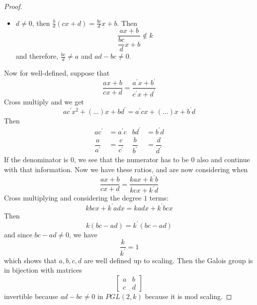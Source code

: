 \documentclass{article}
\begin{document}
\begin{proof}
\begin{itemize}
                \item $d \neq 0$, then $\frac{b}{d}(cx + d) = \frac{bc}{d}x + b$. Then
                    \begin{equation*}
                        \dfrac{ax + b}{\dfrac{bc}{d}x + b} \notin k
                    \end{equation*}
                and therefore, $\frac{bc}{d} \neq a$ and $ad - bc \neq 0$.
            \end{itemize}
        Now for well-defined, suppose that
            \begin{equation*}
                \dfrac{ax + b}{cx + d} = \dfrac{a^{\prime}x + b^{\prime}}{c^{\prime}x + d^{\prime}}
            \end{equation*}
        Cross multiply and we get 
            \begin{equation*}
                ac^{\prime}x^{2} + (\ldots) x + bd^{\prime} = a^{\prime}cx + (\ldots) x + b^{\prime}d
            \end{equation*}
        Then
            \begin{align*}
                ac^{\prime}           &= a^{\prime}c           & bd^{\prime}           &= b^{\prime}d           \\
                \dfrac{a}{a^{\prime}} &= \dfrac{c}{c^{\prime}} & \dfrac{b}{b^{\prime}} &= \dfrac{d}{d^{\prime}}   
            \end{align*}
        If the denominator is $0$, we see that the numerator has to be $0$ also and continue with that information. Now we have these ratios, and are now considering when
            \begin{equation*}
                \dfrac{ax + b}{cx + d} = \dfrac{kax + k^{\prime}b}{kcx + k^{\prime}d}
            \end{equation*}
        Cross multiplying and considering the degree $1$ terms:
            \begin{equation*}
                kbcx + k^{\prime}adx = kadx + k^{\prime}bcx
            \end{equation*}
        Then
            \begin{equation*}
                k(bc - ad) = k^{\prime}(bc - ad)
            \end{equation*}
        and since $bc - ad \neq 0$, we have
            \begin{equation*}
                \dfrac{k}{k^{\prime}} = 1
            \end{equation*}
        which shows that $a, b, c, d$ are well defined up to scaling. Then the Galois group is in bijection with matrices
            \begin{equation*}
                \begin{bmatrix}
                    a & b \\
                    c & d   
                \end{bmatrix}
            \end{equation*}
        invertible because $ad - bc \neq 0$ in $PGL(2, k)$ because it is mod scaling.
    \end{proof} 
\end{document}
